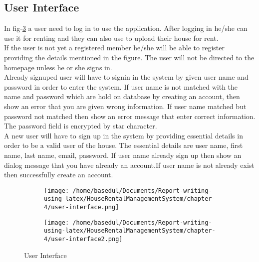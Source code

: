 \documentclass[12pt,a4paper]{report}
\newcommand\tab[1][0cm]{\hspace*{#1}}
\begin{document}
	\subsection{User Interface}
	\tab In fig-\ref{fig:user-info} a user need to log in to use the application. After logging in he/she can use it for renting and they can also
use to upload their house for rent.\\If the user is not yet a registered member he/she will be able to register providing the details mentioned in the figure. The user will not be directed to the homepage unless he or she signs in.\\Already signuped user will have to signin in the system by given user name and
password in order to enter the system. If user name is not matched with the name and
password which are hold on database by creating an account, then show an error that you
are given wrong information. If user name matched but password not matched then show
an error message that enter correct information. The password field is encrypted by star
character.\\A new user will have to sign up in the system by providing essential details in order to
be a valid user of the house. The essential details are user name, first name, last name,
email, password. If user name already sign up then show an dialog message that you have
already an account.If user name is not already exist then successfully create an account.
%
\begin{figure}[H]
 \centering
\begin{subfigure}{0.5\textwidth}
\texttt{[image: /home/basedul/Documents/Report-writing-using-latex/HouseRentalManagementSystem/chapter-4/user-interface.png]} 
\label{fig:user-int}
\end{subfigure}
\begin{subfigure}{0.5\textwidth}
\texttt{[image: /home/basedul/Documents/Report-writing-using-latex/HouseRentalManagementSystem/chapter-4/user-interface2.png]}
\label{fig:subim2}
\end{subfigure}
 
\caption{\hspace{0.35em}User Interface}
\label{fig:user-info}
\end{figure}
\end{document}
